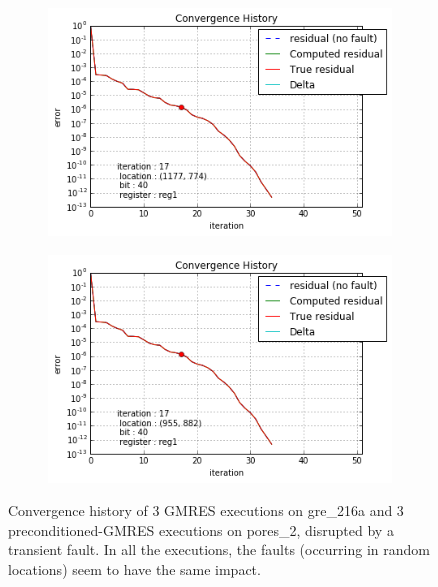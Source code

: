 \begin{figure}[h]
\begin{minipage}[b]{0.48\linewidth}
\begin{subfigure}[t]{\linewidth}
		\includegraphics[width=\linewidth]{figures/pores_2/convergence_history_location_1.png}
		\caption{}\label{fig:pores_2_conv_hist_location_1}
	\end{subfigure}
    \quad
    \begin{subfigure}[t]{\linewidth}
		\centering
		\includegraphics[width=\linewidth]{figures/pores_2/convergence_history_location_2.png}
		\caption{}\label{fig:pores_2_conv_hist_location_2}
	\end{subfigure}

    
	\end{minipage}
	\caption{Convergence history of 3 GMRES executions on gre_216a and 3 preconditioned-GMRES executions on pores_2, disrupted by a transient fault. In all the executions, the faults (occurring in random locations) seem to have the same impact.}\label{fig:prediction}
\end{figure}



